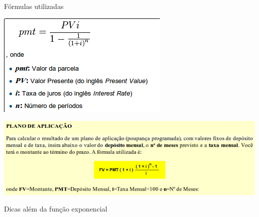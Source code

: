 \documentclass[]{beamer}
\begin{document}

\begin{frame}{\foreignlanguage{brazil}{Fórmulas utilizadas}}

\begin{center}
\includegraphics[scale=0.5]{price}
\par\end{center}

\begin{center}
\includegraphics[scale=0.55]{poupprog}
\par\end{center}

\end{frame}


\begin{frame}[standout]{Dicas além da função exponencial }

\end{frame}
\end{document}
